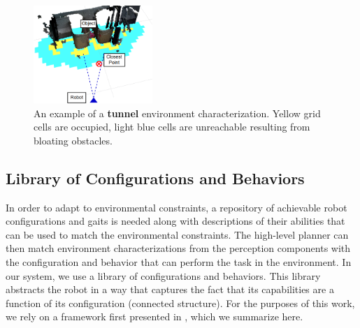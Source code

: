 \documentclass[conference]{IEEEtran}
\begin{document}
%
\begin{figure}
\begin{center}
\includegraphics[width=0.4\textwidth]{images/characterization.png}
\caption{An example of a \textbf{tunnel} environment characterization. Yellow grid cells are occupied, light blue cells are unreachable resulting from bloating obstacles.}
\label{fig:characterization}
\end{center}
\vspace{-2em}
\end{figure}

\subsection{Library of Configurations and Behaviors}
\label{sec:configuration-specifics}
%
In order to adapt to environmental constraints, a repository of achievable robot configurations and gaits is needed along with descriptions of their abilities that can be used to match the environmental constraints. The high-level planner can then match environment characterizations from the perception components with the configuration and behavior that can perform the task in the environment. In our system, we use a library of configurations and behaviors. This library abstracts the robot in a way that captures the fact that its capabilities are a function of its configuration (connected structure). For the purposes of this work, we rely on a framework first presented in \cite{Jing2016}, which we summarize here.
\end{document}
